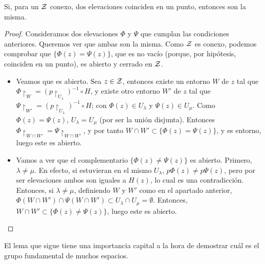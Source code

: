 \begin{lem}
	\label{grf_lema_unicidad_elevacion}
	Si, para un $\mathcal{Z}$ conexo, dos elevaciones coinciden en un punto, entonces son la misma.
	
	\begin{proof}
		Consideramos dos elevaciones $\Phi$ y $\Psi$ que cumplan las condiciones anteriores. Queremos ver que ambas son la misma. Como $\mathcal{Z}$ es conexo, podemos comprobar que $\{\Phi(z)=\Psi(z)\}$, que es no vacío (porque, por hipótesis, coinciden en un punto), es abierto y cerrado en $\mathcal{Z}$.
		
		\begin{itemize}
			\item Veamos que es abierto. Sea $z\in\mathcal{Z}$, entonces existe un entorno $W$ de $z$ tal que $\Phi\restriction_{W}=(p\restriction_{U_\lambda})^{-1}\circ H$, y existe otro entorno $W'$ de $z$ tal que $\Psi\restriction_{W'}=(p\restriction_{U_\lambda})^{-1}\circ H$; con $\Phi(z)\in U_\lambda$ y $\Psi(z)\in U_\mu$. Como $\Phi(z)=\Psi(z)$, $U_\lambda = U_\mu$ (por ser la unión disjunta). Entonces $\Phi\restriction_{W\cap W'}=\Psi\restriction_{W\cap W'}$, y por tanto $W\cap W'\subset\{\Phi(z)=\Psi(z)\}$, y es entorno, luego este es abierto.
			
			\item Vamos a ver que el complementario $\{\Phi(z)\neq\Psi(z)\}$ es abierto. Primero, $\lambda\neq\mu$. En efecto, si estuvieran en el mismo $U_\lambda$, $p\Phi(z)\neq p\Psi(z)$, pero por ser elevaciones ambos son iguales a $H(z)$, lo cual es una contradicción. Entonces, si $\lambda\neq\mu$, definiendo $W$ y $W'$ como en el apartado anterior, $\Phi(W\cap W')\cap \Psi(W\cap W')\subset U_\lambda\cap U_\mu=\emptyset$. Entonces, $W\cap W'\subset \{\Phi(z)\neq\Psi(z)\}$, luego este es abierto. \qedhere
		\end{itemize}
	\end{proof}
\end{lem}

El lema que sigue tiene una importancia capital a la hora de demostrar cuál es el grupo fundamental de muchos espacios.

